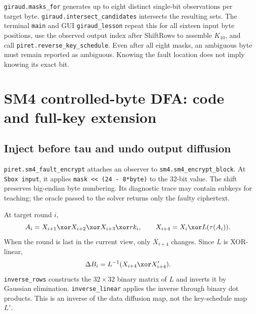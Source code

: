 \texttt{giraud.masks\_\allowbreak{}for} generates up to eight distinct single-bit observations per target byte. \texttt{giraud.intersect\_\allowbreak{}candidates} intersects the resulting sets. The terminal \texttt{main} and GUI \texttt{giraud\_\allowbreak{}lesson} repeat this for all sixteen input byte positions, use the observed output index after ShiftRows to assemble $K_{10}$, and call \texttt{piret.reverse\_\allowbreak{}key\_\allowbreak{}schedule}. Even after all eight masks, an ambiguous byte must remain reported as ambiguous. Knowing the fault location does not imply knowing its exact bit.

\section{SM4 controlled-byte DFA: code and full-key extension}
\subsection{Inject before tau and undo output diffusion}
\texttt{piret.sm4\_\allowbreak{}fault\_\allowbreak{}encrypt} attaches an observer to \texttt{sm4.sm4\_\allowbreak{}encrypt\_\allowbreak{}block}. At \texttt{Sbox input}, it applies \texttt{mask << (24 - 8*byte)} to the 32-bit value. The shift preserves big-endian byte numbering. Its diagnostic trace may contain subkeys for teaching; the oracle passed to the solver returns only the faulty ciphertext.

At target round $i$,
\[
A_i=X_{i+1}\xor X_{i+2}\xor X_{i+3}\xor rk_i,
\qquad X_{i+4}=X_i\xor L(\tau(A_i)).
\]
When the round is last in the current view, only $X_{i+4}$ changes. Since $L$ is XOR-linear,
\[
\Delta B_i=L^{-1}(X_{i+4}\xor X'_{i+4}).
\]
\texttt{inverse\_\allowbreak{}rows} constructs the $32\times32$ binary matrix of $L$ and inverts it by Gaussian elimination. \texttt{inverse\_\allowbreak{}linear} applies the inverse through binary dot products. This is an inverse of the data diffusion map, not the key-schedule map $L'$.
